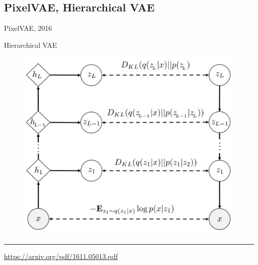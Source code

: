 \subsection{PixelVAE, Hierarchical VAE}
\begin{frame}{PixelVAE, 2016}
	\begin{block}{Hierarchical VAE}
		\begin{figure}
			\centering
			\includegraphics[width=0.7\linewidth]{figs/PixelVAE_1.png}
		\end{figure}
	\end{block}
	\vfill
	\hrule\medskip
	{\scriptsize \href{https://arxiv.org/pdf/1611.05013.pdf}{https://arxiv.org/pdf/1611.05013.pdf}}
\end{frame}
